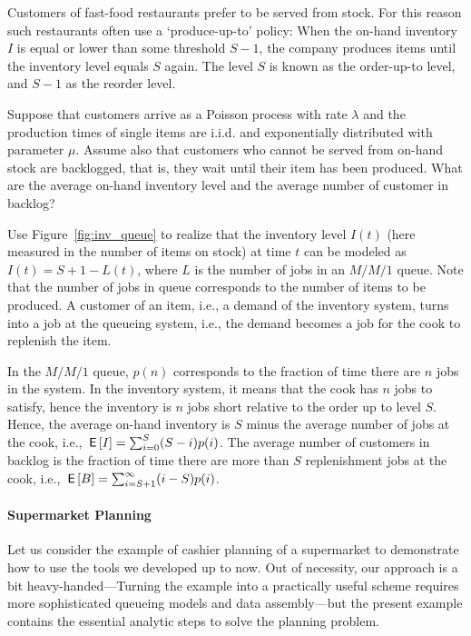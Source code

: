 \begin{exercise}\label{ex:7}
Customers of fast-food restaurants prefer to be served from stock. For this reason such
restaurants often use a `produce-up-to' policy: When the on-hand inventory $I$ is equal or lower than some threshold $S-1$, the company produces items until the inventory level equals $S$ again. The level $S$ is known as the order-up-to level, and $S-1$ as the reorder level.

Suppose that customers arrive as a Poisson process with rate $\lambda$
and the production times of single items are i.i.d. and exponentially
distributed with parameter $\mu$. Assume also that customers who
cannot be served from on-hand stock are backlogged, that is, they wait
until their item has been produced. What are the average on-hand
inventory level and the average number of customer in backlog?
\begin{hint}
Use Figure~\ref{fig:inv_queue} to realize that the inventory level $I(t)$ (here measured in the number of items on stock) at time $t$ can be
  modeled as $I(t) = S+1-L(t)$, where $L$ is the number of jobs in an
  $M/M/1$ queue. Note that the number of jobs in queue corresponds to the number of items to be produced. A customer of an item, i.e., a demand of the inventory system, turns into a job at the queueing system, i.e., the demand becomes a job for the cook to replenish the item.
\end{hint}
  \begin{solution}
In the $M/M/1$ queue, $p(n)$ corresponds to the fraction of time there are $n$ jobs in the system. In the inventory system, it means that the cook has $n$ jobs to satisfy, hence the inventory is $n$ jobs short relative to the order up to level $S$.  Hence, the average on-hand inventory is $S$ minus the average number of jobs at the cook, i.e., $\,\mathsf{E}\left[I\right] = \sum_{i=0}^{S} (S-i) p(i)$. The average number of customers in backlog is the fraction of time there are more than $S$ replenishment jobs at the cook, i.e., $\,\mathsf{E}\left[B\right] = \sum_{i=S+1}^\infty (i-S) p(i)$. 
  \end{solution}
\end{exercise}


\paragraph{Supermarket Planning}

Let us consider the example of cashier planning of a supermarket to
demonstrate how to use the tools we developed up to now. Out of
necessity, our approach is a bit heavy-handed---Turning the example
into a practically useful scheme requires more sophisticated queueing
models and data assembly---but the present example contains the
essential analytic steps to solve the planning problem.

